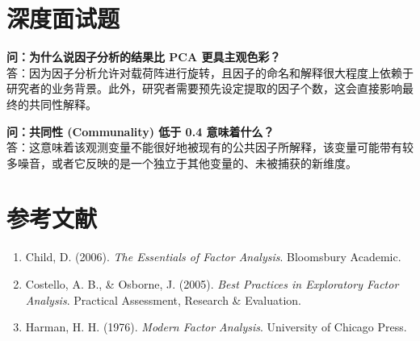 \documentclass[12pt, a4paper]{article}
\begin{document}
\section{深度面试题}

\textbf{问：为什么说因子分析的结果比 PCA 更具主观色彩？}\\
答：因为因子分析允许对载荷阵进行旋转，且因子的命名和解释很大程度上依赖于研究者的业务背景。此外，研究者需要预先设定提取的因子个数，这会直接影响最终的共同性解释。

\textbf{问：共同性 (Communality) 低于 0.4 意味着什么？}\\
答：这意味着该观测变量不能很好地被现有的公共因子所解释，该变量可能带有较多噪音，或者它反映的是一个独立于其他变量的、未被捕获的新维度。

\section{参考文献}
\begin{enumerate}
    \item Child, D. (2006). \textit{The Essentials of Factor Analysis}. Bloomsbury Academic.
    \item Costello, A. B., \& Osborne, J. (2005). \textit{Best Practices in Exploratory Factor Analysis}. Practical Assessment, Research \& Evaluation.
    \item Harman, H. H. (1976). \textit{Modern Factor Analysis}. University of Chicago Press.
\end{enumerate}
\end{document}

